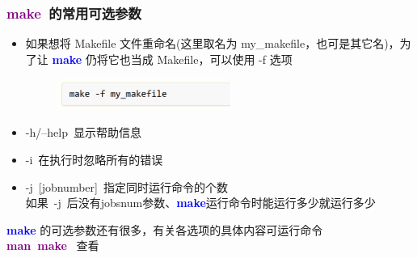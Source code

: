 \frame
{
	\frametitle{\textcolor{purple}{\textbf{make}}~的常用可选参数}
	\begin{itemize}
\item 如果想将 \textrm{Makefile} 文件重命名(这里取名为 \textrm{my\_makefile}，也可是其它名)，为了让 \textcolor{blue}{\textbf{make}} 仍将它也当成 \textrm{Makefile}，可以使用 \textrm{-f} 选项
\begin{figure}[h!]
	\vskip -4pt
\centering
\includegraphics[height=0.4in,clip]{Figures/Make_Makefile_0.png}
\label{Fig:Make_Makefile_0}
\end{figure}
\item \textrm{-h/--help}~显示帮助信息
\item \textrm{-i}~在执行时忽略所有的错误
\item \textrm{-j~[jobnumber]}~指定同时运行命令的个数\\
\vskip 3pt
	如果~\textrm{-j}~后没有\textrm{jobsnum}参数、\textcolor{blue}{\textbf{make}}运行命令时能运行多少就运行多少
	\end{itemize}
\vskip 3pt
\textcolor{blue}{\textbf{make}} 的可选参数还有很多，有关各选项的具体内容可运行命令\\
\textcolor{purple}{\textbf{man~make}}~ 查看
}

